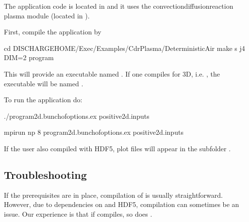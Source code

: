 \documentclass[letterpaper,10pt,english]{sphinxmanual}
\begin{document}
The application code is located in  and it uses the convection\sphinxhyphen{}diffusion\sphinxhyphen{}reaction plasma module (located in ).

First, compile the application by

\begin{sphinxVerbatim}[commandchars=\\\{\},formatcom=\scriptsize]
cd \PYGZdl{}DISCHARGE\PYGZus{}HOME/Exec/Examples/CdrPlasma/DeterministicAir
make \PYGZhy{}s \PYGZhy{}j4 DIM=2 program
\end{sphinxVerbatim}

This will provide an executable named .
If one compiles for 3D, i.e. , the executable will be named .

To run the application do:


\begin{sphinxVerbatim}[commandchars=\\\{\},formatcom=\scriptsize]
./program2d.\PYGZlt{}bunch\PYGZus{}of\PYGZus{}options\PYGZgt{}.ex positive2d.inputs
\end{sphinxVerbatim}


\begin{sphinxVerbatim}[commandchars=\\\{\},formatcom=\scriptsize]
mpirun \PYGZhy{}np 8 program2d.\PYGZlt{}bunch\PYGZus{}of\PYGZus{}options\PYGZgt{}.ex positive2d.inputs
\end{sphinxVerbatim}

If the user also compiled with HDF5, plot files will appear in the subfolder .


\subsection{Troubleshooting}
\label{\detokenize{Base/Installation:troubleshooting}}\label{\detokenize{Base/Installation:chap-troubleshooting}}
If the prerequisites are in place, compilation of  is usually straightforward.
However, due to dependencies on  and HDF5, compilation can sometimes be an issue.
Our experience is that if  compiles, so does .
\end{document}
